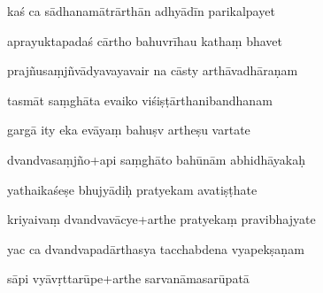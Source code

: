 \documentclass[article,12pt,a4paper]{memoir}%
\newcounter{parCount}
\begin{document}
	  
	  \pstart {} kaś ca sādhanamātrārthān adhyādīn parikalpayet 
	{}
	\pend%
      

	  
	  \pstart \leavevmode%
	aprayuktapadaś cārtho bahuvrīhau kathaṃ bhavet 
	{}
	\pend%
      

	  
	  \pstart {} prajñusaṃjñvādyavayavair na cāsty arthāvadhāraṇam 
	{}
	\pend%
      

	  
	  \pstart \leavevmode%
	tasmāt saṃghāta evaiko viśiṣṭārthanibandhanam 
	{}
	\pend%
      

	  
	  \pstart {} gargā ity eka evāyaṃ bahuṣv artheṣu vartate 
	{}
	\pend%
      

	  
	  \pstart \leavevmode%
	dvandvasaṃjño+api saṃghāto bahūnām abhidhāyakaḥ 
	{}
	\pend%
      

	  
	  \pstart {} yathaikaśeṣe bhujyādiḥ pratyekam avatiṣṭhate 
	{}
	\pend%
      

	  
	  \pstart \leavevmode%
	kriyaivaṃ dvandvavācye+arthe pratyekaṃ pravibhajyate 
	{}
	\pend%
      

	  
	  \pstart {} yac ca dvandvapadārthasya tacchabdena vyapekṣaṇam 
	{}
	\pend%
      

	  
	  \pstart \leavevmode%
	sāpi vyāvṛttarūpe+arthe sarvanāmasarūpatā 
	{}
	\pend%
      
\end{document}
